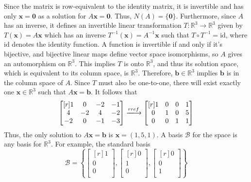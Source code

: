 \documentclass{article}
\theoremstyle{definition}
\newenvironment{solution}[1][]{\begin{replacementsoln}}{\end{replacementsoln}}
\begin{document}
\begin{solution}
  Since the matrix is row-equivalent to the identity matrix, it is invertible and has only \(\mathbf{x}=\mathbf{0}\) as a solution for \(A \mathbf{x}=\mathbf{0}\). Thus, \(N(A)=\{ \mathbf{0} \} \). Furthermore, since \(A\) has an inverse, it defines an invertible linear transformation \(T:\mathbb{R}^3 \to \mathbb{R}^3\) given by \(T(\mathbf{x})=A \mathbf{x}\) which has an inverse \(T^{-1}(\mathbf{x})=A^{-1} \mathbf{x}\) such that \(T\circ T^{-1} =\text{id} \), where \(\text{id} \) denotes the identity function. A function is invertible if and only if it's bijective, and bijective linear maps define vector space isomorphisms, so \(A\) gives an automorphism on \(\mathbb{R}^3\). This implies \(T\) is onto \(\mathbb{R}^3\), and thus its solution space, which is equivalent to its column space, is \(\mathbb{R}^3\). Therefore, \(\mathbf{b}\in\mathbb{R}^3\) implies \(\mathbf{b}\) is in the column space of \(A\). Since \(T\) must also be one-to-one, there will exist exactly one \(\mathbf{x}\in\mathbb{R}^3\) such that \(A \mathbf{x}=\mathbf{b}\). It follows that 
  \[
    \begin{bmatrix}[r]
      1 &0  &-2  &-1   \\
       4&-2  &4  &-2   \\
       -2&0  &-1  &-3   \\
    \end{bmatrix}\xlongrightarrow{rref} \begin{bmatrix}[r]
      1 &0  &0  &1   \\
       0&1  &0  &5   \\
       0&0  &1  &1   \\
    \end{bmatrix}
  \]
  Thus, the only solution to \(A \mathbf{x}=\mathbf{b}\) is \(\mathbf{x}=(1,5,1)\). A basis \(\mathcal{B} \)  for the space is any basis for \(\mathbb{R}^3\). For example, the standard basis
  \[
  \mathcal{B} = \left\{ \begin{bmatrix}[r]
     1 \\
     0 \\
     0 \\
  \end{bmatrix}, \begin{bmatrix}[r]
     0 \\
     1 \\
     0 \\
  \end{bmatrix}, \begin{bmatrix}[r]
     0 \\
     0 \\
     1 \\
  \end{bmatrix} \right\} 
\]
\end{solution}
\end{document}
